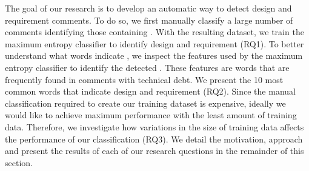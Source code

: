 The goal of our research is to develop an automatic way to detect design and requirement \SATD comments. To do so, we first manually classify a large number of comments identifying those containing \SATD. With the resulting dataset, we train the maximum entropy classifier to identify design and requirement \SATD (RQ1). To better understand what words indicate \SATD, we inspect the features used by the maximum entropy classifier to identify the detected \SATD. These features are words that are frequently found in comments with technical debt. We present the 10 most common words that indicate design and requirement \SATD (RQ2). Since the manual classification required to create our training dataset is expensive, ideally we would like to achieve maximum performance with the least amount of training data. Therefore, we investigate how variations in the size of training data affects the performance of our classification (RQ3). We detail the motivation, approach and present the results of each of our research questions in the remainder of this section. 
